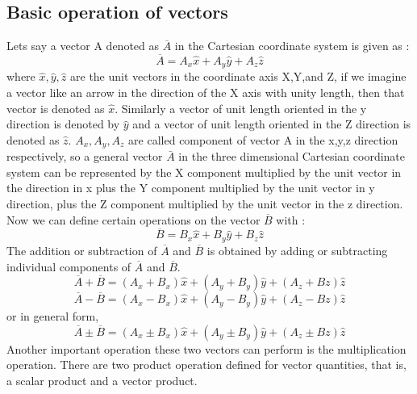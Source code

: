 	  \subsection{Basic operation of vectors}
	  Lets say a vector A denoted as $\overline{A}$ in the Cartesian coordinate system is given as :
	  \begin{equation}
	 \overline{A} = A_{x}\hat{x} + A_{y}\hat{y} + A_{z}\hat{z} 
	  \end{equation}
	  where $\hat{x},\hat{y},\hat{z}$ are the unit vectors in the coordinate axis X,Y,and Z, if we imagine a vector like an arrow in the direction of the X axis with unity length, then that vector is denoted as $\hat{x}$. Similarly a vector of unit length oriented in the y direction is denoted by $\hat{y}$ and a vector of unit length oriented in the Z direction is denoted as $\hat{z}$. $A_{x},A_{y},A_{z}$ are called component of vector A in the x,y,z direction respectively, so a general vector $\bar{A}$ in the three dimensional Cartesian  coordinate system can be represented by the X component multiplied by the unit vector in the direction in x plus the Y component multiplied by the unit vector in y direction, plus the Z component multiplied by the unit vector in the z direction.\\
	  Now we can define certain operations on the vector $\overline{B}$ with : 
	  \begin{equation}
	  \overline{B} = B_{x}\hat{x} + B_{y}\hat{y} + B_{z}\hat{z} 
	  \end{equation} 
	   The addition or subtraction of $\overline{A}$ and $\overline{B}$ is obtained by adding or subtracting individual components of $\overline{A}$ and $\overline{B}$.
	   \begin{equation}
	   \overline{A} + \overline{B} = (A_{x} + B_{x} )\hat{x} + (A_{y} + B_{y})\hat{y} +(A_{z} + B{z})\hat{z} 
	   \end{equation}
	   \begin{equation}
	   \overline{A} - \overline{B} = (A_{x} - B_{x} )\hat{x} + (A_{y} - B_{y})\hat{y} +(A_{z} - B{z})\hat{z}
	   \end{equation}
	   or in general form,
	   \begin{equation}
	   \overline{A} \pm \overline{B} = (A_{x} \pm B_{x} )\hat{x} + (A_{y} \pm B_{y})\hat{y} +(A_{z} \pm B{z})\hat{z}
	   \end{equation}
	   Another important operation these two vectors can perform is the multiplication operation. There are two product operation defined for vector quantities, that is, a scalar product and a vector product.
